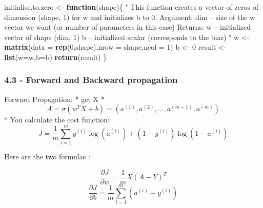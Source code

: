 \documentclass[]{article}
\newenvironment{Shaded}{\begin{snugshade}}{\end{snugshade}}
\newcommand{\KeywordTok}[1]{\textcolor[rgb]{0.13,0.29,0.53}{\textbf{#1}}}
\newcommand{\DataTypeTok}[1]{\textcolor[rgb]{0.13,0.29,0.53}{#1}}
\newcommand{\DecValTok}[1]{\textcolor[rgb]{0.00,0.00,0.81}{#1}}
\newcommand{\StringTok}[1]{\textcolor[rgb]{0.31,0.60,0.02}{#1}}
\newcommand{\ControlFlowTok}[1]{\textcolor[rgb]{0.13,0.29,0.53}{\textbf{#1}}}
\newcommand{\NormalTok}[1]{#1}
\begin{document}
\begin{Shaded}
\begin{Highlighting}[]
\NormalTok{initialise.to.zero <-}\StringTok{ }\ControlFlowTok{function}\NormalTok{(shape)\{}
  \StringTok{"}
\StringTok{    This function creates a vector of zeros of dimension (shape, 1) for w and initializes b to 0.}
\StringTok{    }
\StringTok{    Argument:}
\StringTok{    dim -- size of the w vector we want (or number of parameters in this case)}
\StringTok{    }
\StringTok{    Returns:}
\StringTok{    w -- initialized vector of shape (dim, 1)}
\StringTok{    b -- initialized scalar (corresponds to the bias)}
\StringTok{    "}
\NormalTok{ w <-}\StringTok{ }\KeywordTok{matrix}\NormalTok{(}\DataTypeTok{data =} \KeywordTok{rep}\NormalTok{(}\DecValTok{0}\NormalTok{,shape),}\DataTypeTok{nrow =}\NormalTok{ shape,}\DataTypeTok{ncol =} \DecValTok{1}\NormalTok{) }
\NormalTok{ b <-}\StringTok{ }\DecValTok{0}
\NormalTok{ result <-}\StringTok{ }\KeywordTok{list}\NormalTok{(}\DataTypeTok{w=}\NormalTok{w,}\DataTypeTok{b=}\NormalTok{b)}
 \KeywordTok{return}\NormalTok{(result)}
\NormalTok{\}}
\end{Highlighting}
\end{Shaded}

\subsubsection{4.3 - Forward and Backward
propagation}\label{forward-and-backward-propagation}

Forward Propagation: * get X *
\[A = \sigma(w^T X + b) = (a^{(1)}, a^{(2)}, ..., a^{(m-1)}, a^{(m)})\]
* You calculate the cost function:
\[J = \frac{1}{m}\sum_{i=1}^{m}y^{(i)}\log(a^{(i)})+(1-y^{(i)})\log(1-a^{(i)})\]

Here are the two formulas :

\[ \frac{\partial J}{\partial w} = \frac{1}{m}X(A-Y)^T\tag{7}\]
\[ \frac{\partial J}{\partial b} = \frac{1}{m} \sum_{i=1}^m (a^{(i)}-y^{(i)})\tag{8}\]
\end{document}
